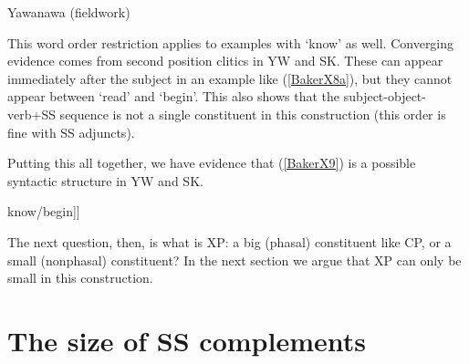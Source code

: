 \documentclass[output=paper]{langscibook}
\begin{document}
\begin{exe}
\ex Yawanawa (fieldwork) \label{BakerX8}
    \begin{xlist}
    \end{xlist}
\end{exe}

This word order restriction applies to examples with ‘know’ as well. Converging evidence comes from second position clitics in YW and SK. These can appear immediately after the subject in an example like (\ref{BakerX8a}), but they cannot appear between ‘read’ and ‘begin’. This also shows that the subject-object-verb+SS sequence is not a single constituent in this construction (this order is fine with SS adjuncts).

Putting this all together, we have evidence that (\ref{BakerX9}) is a possible syntactic structure in YW and SK.

\begin{exe}
    \ex \label{BakerX9} \normalfont[\textsubscript{TP }Shukuvena.\sc{erg} [\textsubscript{VP }[\textsubscript{XP } PRO/t fish cook-\sc{SS}] know/begin]]
\end{exe}

The next question, then, is what is XP: a big (phasal) constituent like CP, or a small (nonphasal) constituent? In the next section we argue that XP can only be small in this construction.

\section{The size of SS complements}\label{sec:baker:3}
\end{document}
